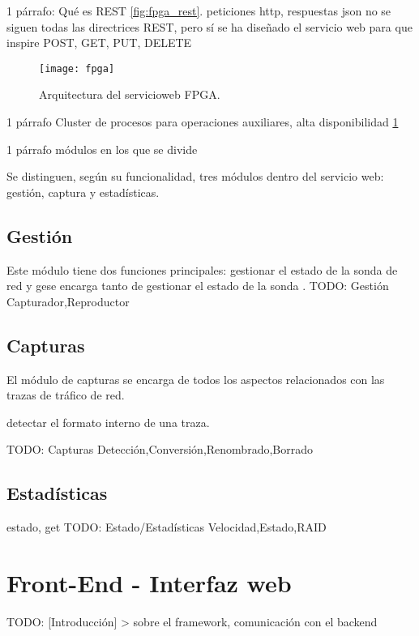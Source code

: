 1 párrafo: Qué es REST \ref{fig:fpga_rest}. peticiones http, respuestas json
no se siguen todas las directrices \gls{REST}, pero sí se ha diseñado el servicio web para que inspire
POST, GET, PUT, DELETE

\begin{figure}[!htp]
  \centering
  \texttt{[image: fpga]}
  \caption{Arquitectura del \gls{servicioweb} \gls{FPGA}.}
  \label{fig:arquitectura_servicio}
\end{figure}

1 párrafo Cluster de procesos para operaciones auxiliares, alta disponibilidad \ref{fig:arquitectura_servicio}

1 párrafo módulos en los que se divide

Se distinguen, según su funcionalidad, tres módulos dentro del servicio web: gestión, captura y estadísticas.
\subsection{Gestión\label{ssec:dis:gestion}}

Este módulo tiene dos funciones principales: gestionar el estado de la sonda de red y gese encarga tanto de gestionar el estado de la sonda .
TODO: Gestión
  {Capturador,Reproductor}


\subsection{Capturas\label{ssec:dis:capturas}}

El módulo de capturas se encarga de todos los aspectos relacionados con las \glspl{traza} de tráfico de red.


detectar el formato interno de una \gls{traza}.

TODO: Capturas
  {Detección,Conversión,Renombrado,Borrado}


\subsection{Estadísticas\label{ssec:dis:estadisticas}}

estado, get
TODO: Estado/Estadísticas
  {Velocidad,Estado,RAID}


\section{Front-End - Interfaz web\label{sec:dis:interfaz_web}}

TODO: [Introducción] > sobre el framework, comunicación con el backend

